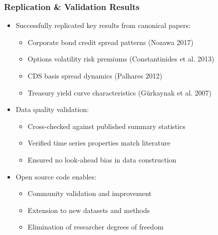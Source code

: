 \documentclass[ignorenonframetext, 9pt]{beamer}
\begin{document}
\begin{frame}
  \frametitle{Replication \& Validation Results}
  \label{slide:validation}
\begin{itemize}
\item \alert{Successfully replicated key results from canonical papers:}
\begin{itemize}
  \item Corporate bond credit spread patterns (Nozawa 2017)
  \item Options volatility risk premiums (Constantinides et al. 2013)
  \item CDS basis spread dynamics (Palhares 2012)
  \item Treasury yield curve characteristics (Gürkaynak et al. 2007)
\end{itemize}
\vspace{0.3cm}
\item \alert{Data quality validation:}
\begin{itemize}
  \item Cross-checked against published summary statistics
  \item Verified time series properties match literature
  \item Ensured no look-ahead bias in data construction
\end{itemize}
\vspace{0.3cm}
\item \alert{Open source code enables:}
\begin{itemize}
  \item Community validation and improvement
  \item Extension to new datasets and methods
  \item Elimination of researcher degrees of freedom
\end{itemize}
\end{itemize}
\end{frame}


\end{document}
